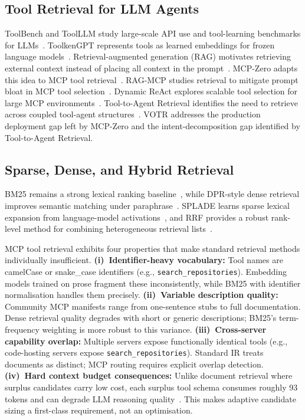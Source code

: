 \documentclass[sigconf,anonymous,review]{acmart}
\newcommand{\votr}{\textsc{VOTR}\xspace}
\newcommand{\mcpzero}{MCP-Zero\xspace}
\begin{document}
\subsection{Tool Retrieval for LLM Agents}
ToolBench and ToolLLM study large-scale API use and tool-learning benchmarks for
LLMs~\cite{toolbench2024}.
ToolkenGPT represents tools as learned embeddings for frozen language
models~\cite{toolkengpt2023}.
Retrieval-augmented generation (RAG) motivates retrieving external context instead
of placing all context in the prompt~\cite{lewis2020rag}.
\mcpzero adapts this idea to MCP tool retrieval~\cite{mcpzero2025}.
RAG-MCP studies retrieval to mitigate prompt bloat in MCP tool
selection~\cite{rag_mcp_2025}.
Dynamic ReAct explores scalable tool selection for large MCP
environments~\cite{dynamic_react_2025}.
Tool-to-Agent Retrieval identifies the need to retrieve across coupled tool-agent
structures~\cite{tool_to_agent_2025}.
\votr addresses the production deployment gap left by \mcpzero and the
intent-decomposition gap identified by Tool-to-Agent Retrieval.

\subsection{Sparse, Dense, and Hybrid Retrieval}
BM25 remains a strong lexical ranking baseline~\cite{robertson2009bm25}, while
DPR-style dense retrieval improves semantic matching under
paraphrase~\cite{karpukhin2020dpr}.
SPLADE learns sparse lexical expansion from language-model
activations~\cite{formal2021splade}, and RRF provides a robust rank-level method
for combining heterogeneous retrieval lists~\cite{cormack2009rrf}.

MCP tool retrieval exhibits four properties that make standard retrieval methods
individually insufficient.
\textbf{(i)~Identifier-heavy vocabulary:} Tool names are camelCase or snake\_case
identifiers (e.g., \texttt{search\_repositories}).
Embedding models trained on prose fragment these inconsistently, while BM25 with
identifier normalisation handles them precisely.
\textbf{(ii)~Variable description quality:} Community MCP manifests range from
one-sentence stubs to full documentation.
Dense retrieval quality degrades with short or generic descriptions; BM25's
term-frequency weighting is more robust to this variance.
\textbf{(iii)~Cross-server capability overlap:} Multiple servers expose functionally
identical tools (e.g., code-hosting servers expose \texttt{search\_repositories}).
Standard IR treats documents as distinct; MCP routing requires explicit overlap
detection.
\textbf{(iv)~Hard context budget consequences:} Unlike document retrieval where
surplus candidates carry low cost, each surplus tool schema consumes roughly 93
tokens and can degrade LLM reasoning quality~\cite{mcpzero2025}.
This makes adaptive candidate sizing a first-class requirement, not an optimisation.
\end{document}
